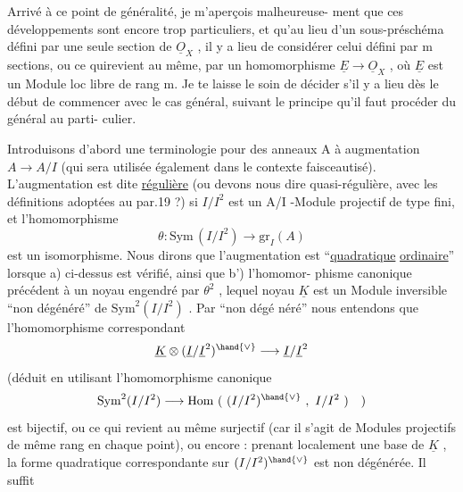 
Arrivé à ce point  de généralité, je m'aperçois malheureuse-%
ment que ces développements sont encore trop particuliers, et qu'au lieu
d'un sous-préschéma défini par une seule section de $\underline{O}_X$ , il y a lieu de
considérer celui défini par m sections, ou ce qui\hand{/}revient au même, par un
homomorphisme $\underline{E} \longrightarrow \underline{O}_X$ , où $\underline{E}$ est un Module loc libre de rang m. Je te
laisse le soin de décider s'il y a lieu dès le début de commencer avec le
cas général, suivant le principe qu'il faut procéder du général au parti-%
culier.

Introduisons d'abord une terminologie pour des anneaux A à
augmentation $A \to A/I$ (qui sera utilisée également dans le contexte
faisceautisé). L'augmentation est dite \uline{régulière} (ou devons nous dire
quasi-régulière, avec les définitions adoptées au par.19 ?) si  $I/I^2$ est
un A/I -Module projectif de type fini, et  l'homomorphisme
\[ \theta\colon \mathrm{Sym}\,(I/I^2) \longrightarrow \mathrm{gr}_I(A) \]
est un isomorphisme. Nous dirons que l'augmentation est  ``\uline{quadratique}
\uline{ordinaire}'' lorsque a) ci-dessus est vérifié, ainsi que b') l'homomor-%
phisme canonique précédent à un noyau engendré par $\theta^2$ , lequel noyau $\underline{K}$
est un Module inversible ``non dégénéré'' de $\mathrm{Sym}^2(I/I^2)$ . Par ``non dégé%
néré'' nous entendons que l'homomorphisme correspondant
\[ \underline{K} \otimes (\underline{I}/\underline{I}^2)^{\hand{\vee}} \longrightarrow \underline{I}/\underline{I}^2 \]
(déduit en utilisant l'homomorphisme canonique
\[ \mathrm{Sym}^2(I/I^2) \longrightarrow \mathrm{Hom}\ (\ (I/I^2)^{\hand{\vee}}\ ,\ I/I^2\ )\quad ) \]
est bijectif, ou ce qui revient au même surjectif (car il s'agit de
Modules projectifs  de même rang en chaque point), ou encore : prenant
localement une base \inserted{$\phi$} de $\underline{K}$ ,  la forme
quadratique correspondante sur $(I/I^2)^{\hand{\vee}}$ est non dégénérée. Il suffit

